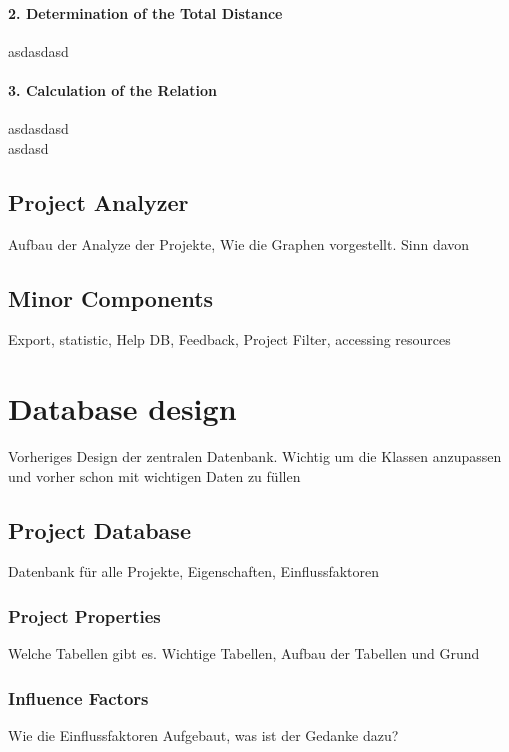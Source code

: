 \paragraph*{\textbf{2. Determination of the Total Distance}}
asdasdasd
\paragraph*{\textbf{3. Calculation of the Relation}}
asdasdasd\\
asdasd

\subsection{Project Analyzer}

Aufbau der Analyze der Projekte, Wie die Graphen vorgestellt. Sinn davon

\subsection{Minor Components}

Export, statistic, Help DB, Feedback, Project Filter, accessing resources


\section{Database design}

Vorheriges Design der zentralen Datenbank. Wichtig um die Klassen anzupassen und vorher schon mit wichtigen Daten zu füllen

\subsection{Project Database}

Datenbank für alle Projekte, Eigenschaften, Einflussfaktoren

\subsubsection{Project Properties}

Welche Tabellen gibt es. Wichtige Tabellen, Aufbau der Tabellen und Grund

\subsubsection{Influence Factors}

Wie die Einflussfaktoren Aufgebaut, was ist der Gedanke dazu?


